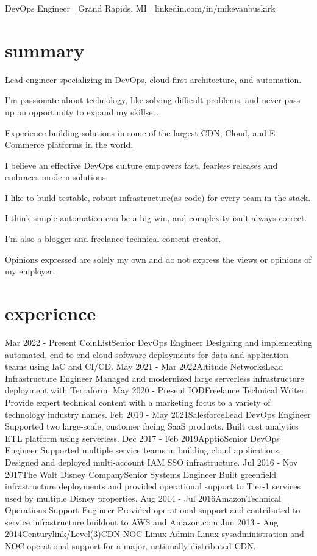 \documentclass[]{mv_cv}
\begin{document}
       {DevOps Engineer | Grand Rapids, MI | linkedin.com/in/mikevanbuskirk}
 
\section{summary}
\begin{content}
  {
Lead engineer specializing in DevOps, cloud-first architecture, and automation.

I'm passionate about technology, like solving difficult problems, and never pass up an opportunity to expand my skillset.

Experience building solutions in some of the largest CDN, Cloud, and E-Commerce platforms in the world.

I believe an effective DevOps culture empowers fast, fearless releases and embraces modern solutions.

I like to build testable, robust infrastructure(as code) for every team in the stack.

I think simple automation can be a big win, and complexity isn't always correct.

I'm also a blogger and freelance technical content creator.

Opinions expressed are solely my own and do not express the views or opinions of my employer.
  }
\end{content}

\section{experience}
  \begin{explist}
    \expitem
    {Mar 2022 - Present  }{CoinList}{Senior DevOps Engineer}
    {Designing and implementing automated, end-to-end cloud software deployments for data and application teams using IaC and CI/CD.}
    \expitem
    {May 2021 - Mar 2022}{Altitude Networks}{Lead Infrastructure Engineer}
    {Managed and modernized large serverless infrastructure deployment with Terraform.}
    \expitem
    {May 2020 - Present  }{IOD}{Freelance Technical Writer}
    {Provide expert technical content with a marketing focus to a variety of technology industry names.}
    \expitem
    {Feb 2019 - May 2021}{Salesforce}{Lead DevOps Engineer}
    {Supported two large-scale, customer facing SaaS products. Built cost analytics ETL platform using serverless.}
    \expitem
    {Dec 2017 - Feb 2019}{Apptio}{Senior DevOps Engineer}
    {Supported multiple service teams in building cloud applications. Designed and deployed multi-account IAM SSO infrastructure.}
    \expitem
    {Jul 2016 - Nov 2017}{The Walt Disney Company}{Senior Systems Engineer}
    {Built greenfield infrastructure deployments and provided operational support to Tier-1 services used by multiple Disney properties.}
    \expitem
    {Aug 2014 - Jul 2016}{Amazon}{Technical Operations Support Engineer}
    {Provided operational support and contributed to service infrastructure buildout to AWS and Amazon.com}
   \expitem
    {Jun 2013 - Aug 2014}{Centurylink/Level(3)}{CDN NOC Linux Admin}
    {Linux sysadministration and NOC operational support for a major, nationally distributed CDN.}
  \end{explist}
\end{document}
